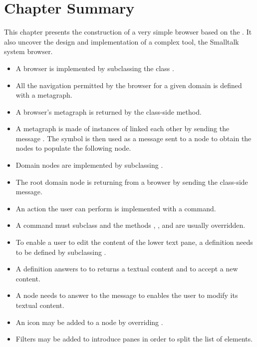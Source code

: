 \documentclass[a4paper,10pt,twoside]{book}
\begin{document}

\section{Chapter Summary}

This chapter presents the construction of a very simple browser based on the \obf. It also uncover the design and implementation of a complex tool, the Smalltalk system browser.

\begin{itemize}
\item A browser is implemented by subclassing the class .
\item All the navigation permitted by the browser for a given domain is defined with a metagraph.
\item A browser's metagraph is returned by the  class-side method.
\item A metagraph is made of instances of  linked each other by sending the message . The symbol  is then used as a message sent to a node to obtain the nodes to populate the following node.
\item Domain nodes are implemented by subclassing .
\item The root domain node is returning from a browser by sending the  class-side message.
\item An action the user can perform is implemented with a command.
\item A command must subclass  and the methods , ,  and  are usually overridden.
\item To enable a user to edit the content of the lower text pane, a definition needs to be defined by subclassing .
\item A definition answers to  to returns a textual content and  to accept a new content.
\item A node needs to answer to the  message to enables the user to modify its textual content.
\item An icon may be added to a node by overriding .
\item Filters may be added to introduce panes in order to split the list of elements.
\end{itemize}
\end{document}
